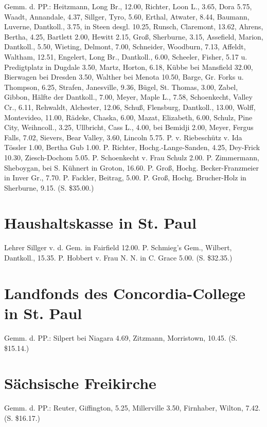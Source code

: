 Gemm. d. PP.: Heitzmann, Long Br., 12.00, Richter, Loon L., 3.65, Dora 5.75, Waadt, Annandale, 4.37, Sillger, Tyro, 5.60, Erthal, Atwater, 8.44, Baumann, Luverne, Dantkoll., 3.75, in Steen desgl. 10.25, Runsch, Claremont, 13.62, Ahrens, Bertha, 4.25, Bartlett 2.00, Hewitt 2.15, Groß, Sherburne, 3.15, Assefield, Marion, Dantkoll., 5.50, Wieting, Delmont, 7.00, Schneider, Woodburn, 7.13, Affeldt, Waltham, 12.51, Engelert, Long Br., Dantkoll., 6.00, Scheeler, Fisher, 5.17 u. Predigtplatz in Dugdale 3.50, Martz, Horton, 6.18, Kübbe bei Mansfield 32.00, Bierwagen bei Dresden 3.50, Walther bei Menota 10.50, Barge, Gr. Forks u. Thompson, 6.25, Strafen, Janesville, 9.36, Bügel, St. Thomas, 3.00, Zabel, Gibbon, Hälfte der Dantkoll., 7.00, Meyer, Maple L., 7.58, Schoenkecht, Valley Cr., 6.11, Rehwaldt, Alchester, 12.06, Schuß, Flensburg, Dantkoll., 13.00, Wolff, Montevideo, 11.00, Rädeke, Chaska, 6.00, Mazat, Elizabeth, 6.00, Schulz, Pine City, Weihncoll., 3.25, Ullbricht, Cass L., 4.00, bei Bemidji 2.00, Meyer, Fergus Falls, 7.02, Sievers, Bear Valley, 3.60, Lincoln 5.75. P. v. Riebeschütz v. Ida Tössler 1.00, Bertha Gub 1.00. P. Richter, Hochg.-Lange-Sanden, 4.25, Dey-Frick 10.30, Ziesch-Dochom 5.05. P. Schoenkecht v. Frau Schulz 2.00. P. Zimmermann, Sheboygan, bei S. Kühnert in Groton, 16.60. P. Groß, Hochg. Becker-Franzmeier in Inver Gr., 7.70. P. Fackler, Beitrag, 5.00. P. Groß, Hochg. Brucher-Holz in Sherburne, 9.15. (S. \$35.00.)

\section{Haushaltskasse in St. Paul}

Lehrer Sillger v. d. Gem. in Fairfield 12.00. P. Schmieg’s Gem., Wilbert, Dantkoll., 15.35. P. Hobbert v. Frau N. N. in C. Grace 5.00. (S. \$32.35.)

\section{Landfonds des Concordia-College in St. Paul}

Gemm. d. PP.: Silpert bei Niagara 4.69, Zitzmann, Morristown, 10.45. (S. \$15.14.)

\section{Sächsische Freikirche}

Gemm. d. PP.: Reuter, Giffington, 5.25, Millerville 3.50, Firnhaber, Wilton, 7.42. (S. \$16.17.)

